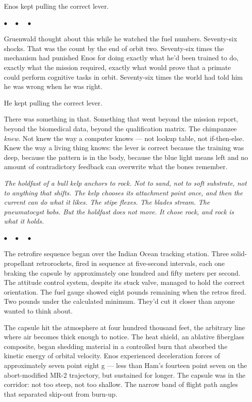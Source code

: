 \documentclass[12pt, letterpaper]{article}
\begin{document}
Enos kept pulling the correct lever.

\begin{center}
$\bullet\quad\bullet\quad\bullet$
\end{center}

Gruenwald thought about this while he watched the fuel numbers. Seventy-six shocks. That was the count by the end of orbit two. Seventy-six times the mechanism had punished Enos for doing exactly what he'd been trained to do, exactly what the mission required, exactly what would prove that a primate could perform cognitive tasks in orbit. Seventy-six times the world had told him he was wrong when he was right.

He kept pulling the correct lever.

There was something in that. Something that went beyond the mission report, beyond the biomedical data, beyond the qualification matrix. The chimpanzee \emph{knew}. Not knew the way a computer knows --- not lookup table, not if-then-else. Knew the way a living thing knows: the lever is correct because the training was deep, because the pattern is in the body, because the blue light means left and no amount of contradictory feedback can overwrite what the bones remember.

\emph{The holdfast of a bull kelp anchors to rock. Not to sand, not to soft substrate, not to anything that shifts. The kelp chooses its attachment point once, and then the current can do what it likes. The stipe flexes. The blades stream. The pneumatocyst bobs. But the holdfast does not move. It chose rock, and rock is what it holds.}

\begin{center}
$\bullet\quad\bullet\quad\bullet$
\end{center}

The retrofire sequence began over the Indian Ocean tracking station. Three solid-propellant retrorockets, fired in sequence at five-second intervals, each one braking the capsule by approximately one hundred and fifty meters per second. The attitude control system, despite its stuck valve, managed to hold the correct orientation. The fuel gauge showed eight pounds remaining when the retros fired. Two pounds under the calculated minimum. They'd cut it closer than anyone wanted to think about.

The capsule hit the atmosphere at four hundred thousand feet, the arbitrary line where air becomes thick enough to notice. The heat shield, an ablative fiberglass composite, began shedding material in a controlled burn that absorbed the kinetic energy of orbital velocity. Enos experienced deceleration forces of approximately seven point eight g --- less than Ham's fourteen point seven on the abort-modified MR-2 trajectory, but sustained for longer. The capsule was in the corridor: not too steep, not too shallow. The narrow band of flight path angles that separated skip-out from burn-up.
\end{document}
